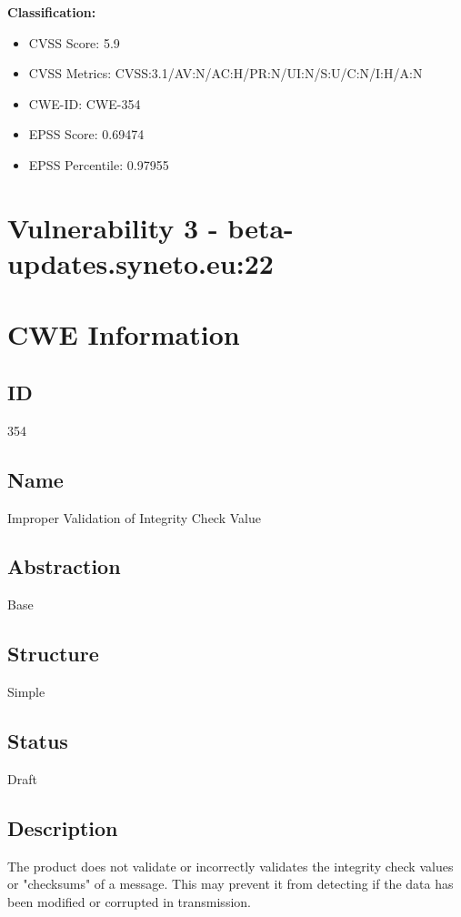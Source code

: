 \textbf{Classification:}
\begin{itemize}
\item CVSS Score: 5.9
\item CVSS Metrics: CVSS:3.1/AV:N/AC:H/PR:N/UI:N/S:U/C:N/I:H/A:N
\item CWE-ID: CWE-354
\item EPSS Score: 0.69474
\item EPSS Percentile: 0.97955
\end{itemize}



\section*{Vulnerability 3 - beta-updates.syneto.eu:22}

\section*{CWE Information}
\subsection*{ID}
354

\subsection*{Name}
Improper Validation of Integrity Check Value

\subsection*{Abstraction}
Base

\subsection*{Structure}
Simple

\subsection*{Status}
Draft

\subsection*{Description}
The product does not validate or incorrectly validates the integrity check values or "checksums" of a message. This may prevent it from detecting if the data has been modified or corrupted in transmission.

